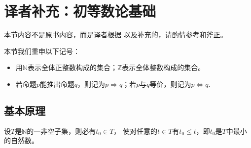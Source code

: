 \section{译者补充：初等数论基础}\label{sec:译者补充：初等数论基础}

\begin{remark}
    本节内容不是原书内容，而是译者根据\citet{ElementaryNumberTheory}
    以及\citet{wiki:ExtendedEuclideanAlgorithm}补充的，请酌情参考和斧正。
\end{remark}

\begin{notation}
    本节我们重申以下记号：
    \begin{itemize}
        \item 用$\mathbb{N}$表示全体正整数构成的集合；$\mathbb{Z}$表示全体整数构成的集合。
        \item 若命题$p$能推出命题$q$，则记为$p\Rightarrow q$；若$p$与$q$等价，则记为$p\Leftrightarrow q$.
    \end{itemize}
\end{notation}

\subsection*{基本原理}
\begin{theorem}\label{theorem:7.ex02.1}
    设$T$是$\mathbb{N}$的一非空子集，则必有$t_0\in T$，
    使对任意的$t\in T$有$t_0\le t$，即$t_0$是$T$中最小的自然数。
\end{theorem}



